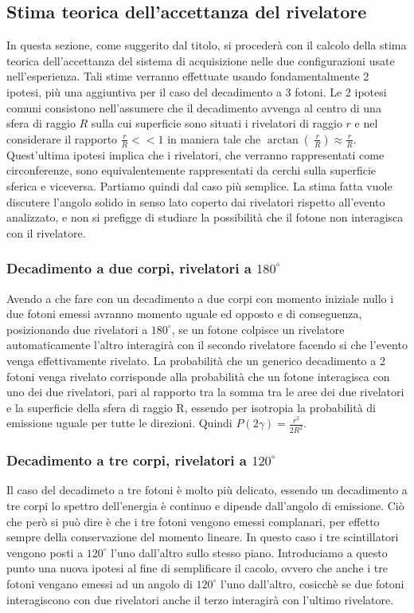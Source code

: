 \subsection{Stima teorica dell'accettanza del rivelatore}
  In questa sezione, come suggerito dal titolo, si procederà con il calcolo della stima teorica dell'accettanza del sistema di acquisizione nelle due configurazioni usate 
  nell'esperienza. Tali stime verranno effettuate usando fondamentalmente 2 ipotesi, più una aggiuntiva per il caso del decadimento a 3 fotoni. Le 2 ipotesi comuni consistono 
  nell'assumere che il decadimento avvenga al centro di una sfera di raggio \(R\) sulla cui superficie sono situati i rivelatori di raggio \(r\) e nel considerare il rapporto 
  \( \frac{r}{R} << 1 \) in maniera tale che \(\arctan\left(\ \frac{r}{R} \right) \approx \frac{r}{R} \). Quest'ultima ipotesi implica che i rivelatori, che verranno rappresentati come
  circonferenze, sono equivalentemente rappresentati da cerchi sulla superficie sferica e viceversa. Partiamo quindi dal caso più semplice. La stima fatta vuole
discutere l'angolo solido in senso lato coperto dai rivelatori rispetto all'evento analizzato, e non si prefigge di studiare la possibilità che il fotone non
interagisca con il rivelatore.
  \subsubsection{Decadimento a due corpi, rivelatori a \(180^\circ\)}
  Avendo a che fare con un decadimento a due corpi con momento iniziale nullo i due fotoni emessi avranno momento uguale ed opposto e di conseguenza, posizionando due rivelatori
  a \(180^\circ\), se un fotone colpisce un rivelatore automaticamente l'altro interagirà con il secondo rivelatore facendo si che l'evento venga effettivamente rivelato. La
  probabilità che un generico decadimento a 2 fotoni venga rivelato corrisponde alla probabilità che un fotone interagisca con  uno dei due rivelatori, pari al rapporto tra la 
  somma tra le aree dei due rivelatori e la superficie della sfera di raggio R, essendo per isotropia la probabilità di emissione uguale per tutte le direzioni. Quindi
  \(P\left(2\gamma\right) = \frac{r^2}{2R^2}\).
  \subsubsection{Decadimento a tre corpi, rivelatori a \(120^\circ\)}
  Il caso del decadimeto a tre fotoni è molto più delicato, essendo un decadimento a tre corpi lo spettro dell'energia è continuo e dipende dall'angolo di emissione. Ciò che però
  si può dire è che i tre fotoni vengono emessi complanari, per effetto sempre della conservazione del momento lineare. In questo caso i tre scintillatori vengono posti a \(120^\circ\)
  l'uno dall'altro sullo stesso piano. Introduciamo a questo punto una nuova ipotesi al fine di semplificare il cacolo, ovvero che anche i tre fotoni vengano emessi ad un angolo di
  \(120^\circ\) l'uno dall'altro, cosicchè se due fotoni interagiscono con due rivelatori anche il terzo interagirà con l'ultimo rivelatore. 
  
